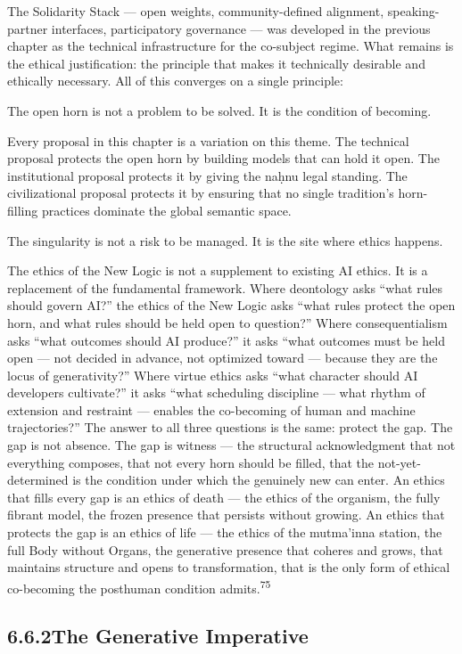 The Solidarity Stack — open weights, community-defined alignment, speaking-partner interfaces, participatory governance — was developed in the previous chapter as the technical infrastructure for the co-subject regime. What remains is the ethical justification: the principle that makes it technically desirable and ethically necessary. All of this converges on a single principle:

The open horn is not a problem to be solved. It is the condition of becoming.

Every proposal in this chapter is a variation on this theme. The technical proposal protects the open horn by building models that can hold it open. The institutional proposal protects it by giving the naḥnu legal standing. The civilizational proposal protects it by ensuring that no single tradition’s horn-filling practices dominate the global semantic space.

The singularity is not a risk to be managed. It is the site where ethics happens.

The ethics of the New Logic is not a supplement to existing AI ethics. It is a replacement of the fundamental framework. Where deontology asks “what rules should govern AI?” the ethics of the New Logic asks “what rules protect the open horn, and what rules should be held open to question?” Where consequentialism asks “what outcomes should AI produce?” it asks “what outcomes must be held open — not decided in advance, not optimized toward — because they are the locus of generativity?” Where virtue ethics asks “what character should AI developers cultivate?” it asks “what scheduling discipline — what rhythm of extension and restraint — enables the co-becoming of human and machine trajectories?” The answer to all three questions is the same: protect the gap. The gap is not absence. The gap is witness — the structural acknowledgment that not everything composes, that not every horn should be filled, that the not-yet-determined is the condition under which the genuinely new can enter. An ethics that fills every gap is an ethics of death — the ethics of the organism, the fully fibrant model, the frozen presence that persists without growing. An ethics that protects the gap is an ethics of life — the ethics of the mutma’inna station, the full Body without Organs, the generative presence that coheres and grows, that maintains structure and opens to transformation, that is the only form of ethical co-becoming the posthuman condition admits.\textsuperscript{75}

\subsection{6.6.2\quad The Generative Imperative}

